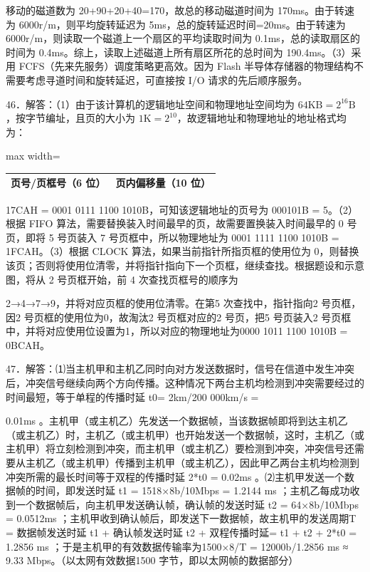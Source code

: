 \documentclass[UTF8,11pt]{ctexart}
\begin{document}
移动的磁道数为 20+90+20+40=170，故总的移动磁道时间为 170ms。由于转速为 6000r/m，则平均旋转延迟为 5ms，总的旋转延迟时间=20ms。由于转速为 6000r/m，则读取一个磁道上一个扇区的平均读取时间为 0.1ms，总的读取扇区的时间为 0.4ms。综上，读取上述磁道上所有扇区所花的总时间为 190.4ms。（3）采用 FCFS（先来先服务）调度策略更高效。因为 Flash 半导体存储器的物理结构不需要考虑寻道时间和旋转延迟，可直接按 I/O 请求的先后顺序服务。


46．解答：（1）由于该计算机的逻辑地址空间和物理地址空间均为 \(\displaystyle 64\mathrm{KB}=2^{16}\mathrm{B}\)，按字节编址，且页的大小为 \(\displaystyle 1\mathrm{K}=2^{10}\)，故逻辑地址和物理地址的地址格式均为：


\begin{center}\begin{adjustbox}{max width=\linewidth}\begin{tabular}{|>{\raggedright\arraybackslash}p{\dimexpr(\linewidth-4\tabcolsep-3\arrayrulewidth)/2\relax}|>{\raggedright\arraybackslash}p{\dimexpr(\linewidth-4\tabcolsep-3\arrayrulewidth)/2\relax}|}\hline
页号/页框号（6 位） & 页内偏移量（10 位）\\\hline\end{tabular}\end{adjustbox}\end{center}

17CAH = 0001 0111 1100 1010B，可知该逻辑地址的页号为 000101B = 5。（2）根据 FIFO 算法，需要替换装入时间最早的页，故需要置换装入时间最早的 0 号页，即将 5 号页装入 7 号页框中，所以物理地址为 0001 1111 1100 1010B = 1FCAH。（3）根据 CLOCK 算法，如果当前指针所指页框的使用位为 0，则替换该页；否则将使用位清零，并将指针指向下一个页框，继续查找。根据题设和示意图，将从 2 号页框开始，前 4 次查找页框号的顺序为


2→4→7→9，并将对应页框的使用位清零。在第5 次查找中，指针指向2 号页框，因2 号页框的使用位为0，故淘汰2 号页框对应的2 号页，把5 号页装入2 号页框中，并将对应使用位设置为1，所以对应的物理地址为0000 1011 1100 1010B = 0BCAH。


47．解答：⑴当主机甲和主机乙同时向对方发送数据时，信号在信道中发生冲突后，冲突信号继续向两个方向传播。这种情况下两台主机均检测到冲突需要经过的时间最短，等于单程的传播时延 t0= 2km/200 000km/s =


0.01ms 。主机甲（或主机乙）先发送一个数据帧，当该数据帧即将到达主机乙（或主机乙）时，主机乙（或主机甲）也开始发送一个数据帧，这时，主机乙（或主机甲）将立刻检测到冲突，而主机甲（或主机乙）要检测到冲突，冲突信号还需要从主机乙（或主机甲）传播到主机甲（或主机乙），因此甲乙两台主机均检测到冲突所需的最长时间等于双程的传播时延 2*t0 = 0.02ms 。⑵主机甲发送一个数据帧的时间，即发送时延 t1 = 1518×8b/10Mbps = 1.2144 ms ；主机乙每成功收到一个数据帧后，向主机甲发送确认帧，确认帧的发送时延 t2 = 64×8b/10Mbps = 0.0512ms ；主机甲收到确认帧后，即发送下一数据帧，故主机甲的发送周期T = 数据帧发送时延 t1 + 确认帧发送时延 t2 + 双程传播时延= t1 + t2 + 2*t0 = 1.2856 ms ；于是主机甲的有效数据传输率为1500×8/T = 12000b/1.2856 ms ≈ 9.33 Mbps。（以太网有效数据1500 字节，即以太网帧的数据部分）
\end{document}
